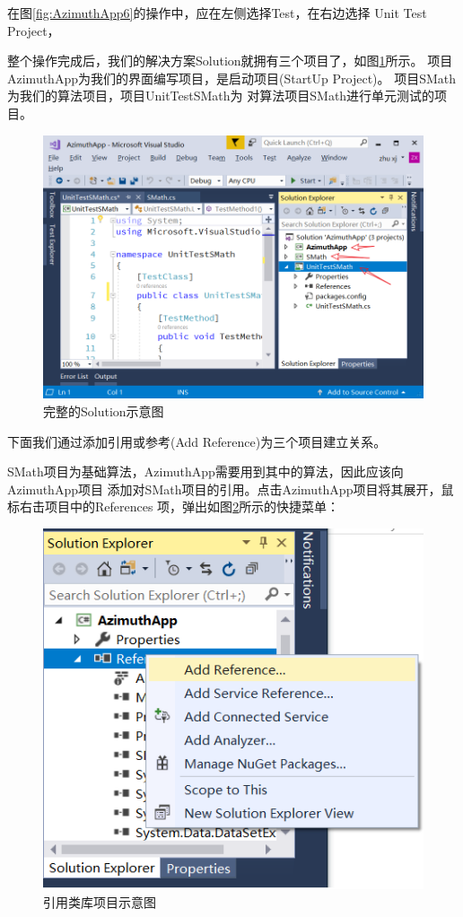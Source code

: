 在图\ref{fig:AzimuthApp6}的操作中，应在左侧选择Test，在右边选择 Unit Test Project，

整个操作完成后，我们的解决方案Solution就拥有三个项目了，如图\ref{fig:AzimuthApp7}所示。
项目AzimuthApp为我们的界面编写项目，是启动项目(StartUp Project)。
项目SMath为我们的算法项目，项目UnitTestSMath为
对算法项目SMath进行单元测试的项目。

\begin{figure}[htbp]
\centering
\includegraphics[scale=0.7]{chapter/surveybase/AzimuthApp7.png}
\caption{完整的Solution示意图}
\label{fig:AzimuthApp7}
\end{figure}

下面我们通过添加引用或参考(Add Reference)为三个项目建立关系。

SMath项目为基础算法，AzimuthApp需要用到其中的算法，因此应该向AzimuthApp项目
添加对SMath项目的引用。点击AzimuthApp项目将其展开，鼠标右击项目中的References
项，弹出如图\ref{fig:AzimuthApp4}所示的快捷菜单：

\begin{figure}[htbp]
\centering
\includegraphics[scale=0.8]{chapter/surveybase/AzimuthApp4.png}
\caption{引用类库项目示意图}
\label{fig:AzimuthApp4}
\end{figure}

